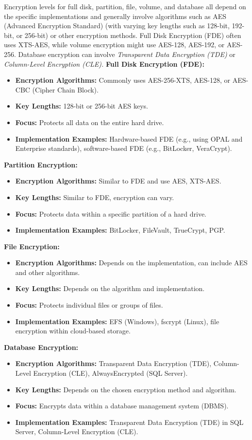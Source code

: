  Encryption levels for full disk, partition, file, volume, and database all depend on the specific implementations and generally involve algorithms such as AES (Advanced Encryption Standard) (with varying key lengths such as 128-bit, 192-bit, or 256-bit) or other encryption methods. Full Disk Encryption (FDE) often uses XTS-AES, while volume encryption might use AES-128, AES-192, or AES-256. Database encryption can involve \textit{ Transparent Data Encryption (TDE)} or \textit{Column-Level Encryption (CLE).}
\textbf{Full Disk Encryption (FDE):}
\begin{itemize}
    \item \textbf{Encryption Algorithms:} Commonly uses AES-256-XTS, AES-128, or AES-CBC (Cipher Chain Block).
    \item \textbf{Key Lengths:} 128-bit or 256-bit AES keys.
    \item \textbf{Focus:} Protects all data on the entire hard drive.
    \item \textbf{Implementation Examples:} Hardware-based FDE (e.g., using OPAL and Enterprise standards), software-based FDE (e.g., BitLocker, VeraCrypt).
\end{itemize}
\textbf{Partition Encryption:}
\begin{itemize}
    \item \textbf{Encryption Algorithms:} Similar to FDE and use AES, XTS-AES.
    \item \textbf{Key Lengths:} Similar to FDE, encryption can vary.
    \item \textbf{Focus:} Protects data within a specific partition of a hard drive.
    \item \textbf{Implementation Examples:} BitLocker, FileVault, TrueCrypt, PGP.
\end{itemize}
\textbf{File Encryption:}
\begin{itemize}
    \item \textbf{Encryption Algorithms:} Depends on the implementation, can include AES and other algorithms.
    \item \textbf{Key Lengths:} Depends on the algorithm and implementation.
    \item \textbf{Focus:} Protects individual files or groups of files.
    \item \textbf{Implementation Examples:} EFS (Windows), fscrypt (Linux), file encryption within cloud-based storage.
\end{itemize}
\textbf{Database Encryption:}
\begin{itemize}
    \item \textbf{Encryption Algorithms:} Transparent Data Encryption (TDE), Column-Level Encryption (CLE), AlwaysEncrypted (SQL Server).
    \item \textbf{Key Lengths:} Depends on the chosen encryption method and algorithm.
    \item \textbf{Focus:} Encrypts data within a database management system (DBMS).
    \item \textbf{Implementation Examples:} Transparent Data Encryption (TDE) in SQL Server, Column-Level Encryption (CLE).
\end{itemize}

